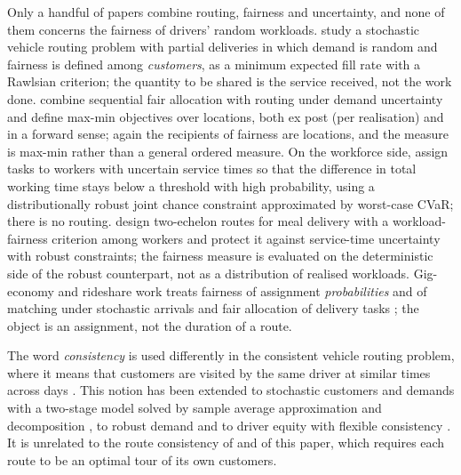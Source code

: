 \documentclass[11pt]{article}
\theoremstyle{definition}
\begin{document}
Only a handful of papers combine routing, fairness and uncertainty, and none
of them concerns the fairness of drivers' random workloads.
\citet{kinable2026fair} study a stochastic vehicle routing problem with
partial deliveries in which demand is random and fairness is defined among
\emph{customers}, as a minimum expected fill rate with a Rawlsian criterion;
the quantity to be shared is the service received, not the work done. \citet{gao2026sequential} combine sequential fair allocation with
routing under demand uncertainty and define max-min objectives over
locations, both ex post (per realisation) and in a forward sense; again the
recipients of fairness are locations, and the measure is max-min rather
than a general ordered measure. On the workforce side, \citet{anh2022workload}
assign tasks to workers with uncertain service times so that the difference
in total working time stays below a threshold with high probability, using a
distributionally robust joint chance constraint approximated by worst-case
CVaR; there is no routing. \citet{lin2022robust} design two-echelon routes
for meal delivery with a workload-fairness criterion among workers and
protect it against service-time uncertainty with robust constraints; the
fairness measure is evaluated on the deterministic side of the robust
counterpart, not as a distribution of realised workloads. Gig-economy and
rideshare work treats fairness of assignment \emph{probabilities} and of
matching under stochastic arrivals \citep{singh2023fairassign,nanda2020balancing}
and fair allocation of delivery tasks \citep{basik2021fair,hosseini2025algorithmic};
the object is an assignment, not the duration of a route.

The word \emph{consistency} is used differently in the consistent vehicle
routing problem, where it means that customers are visited by the same driver
at similar times across days \citep{groer2009consistent,kovacs2015generalized}.
This notion has been extended to stochastic customers and demands with a
two-stage model solved by sample average approximation and decomposition
\citep{alvarez2024consistent}, to robust demand \citep{wu2025exact} and to
driver equity with flexible consistency \citep{yu2024consistent}. It is
unrelated to the route consistency of \citet{ljubic2026fair} and of this
paper, which requires each route to be an optimal tour of its own customers.
\end{document}
